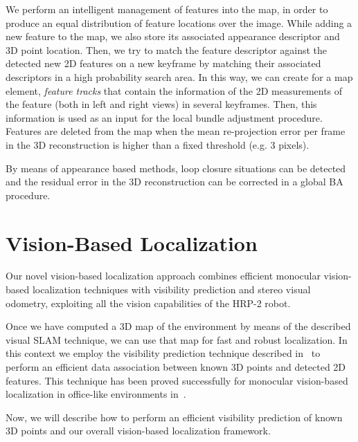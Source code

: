 \documentclass[conference]{IEEEtran}
\begin{document}
We perform an intelligent management of features into the map, in order to produce an equal distribution of feature locations over the image. While adding a new feature to the map, we also store its associated appearance descriptor and 3D point location. Then, we try to match the feature descriptor against the detected new 2D features on a new keyframe by matching their associated descriptors in a high probability search area. In this way, we can create for a map element, \textit{feature tracks} that contain the information of the 2D measurements of the feature (both in left and right views) in several keyframes. Then, this information is used as an input for the local bundle adjustment procedure. Features are deleted from the map when the mean re-projection error per frame in the 3D reconstruction is higher than a fixed threshold (e.g. 3 pixels). 

By means of appearance based methods, loop closure situations can be detected and the residual error in the 3D reconstruction can be corrected in a global BA procedure.

\section{Vision-Based Localization}\label{sec:localization}
Our novel vision-based localization approach combines efficient monocular vision-based localization techniques with visibility prediction and stereo visual odometry, exploiting all the vision capabilities of the HRP-2 robot. 

Once we have computed a 3D map of the environment by means of the described visual SLAM technique, we can use that map for fast and robust localization. In this context we employ the visibility prediction technique described in~\cite{Alcantarilla11icra} to perform an efficient data association between known 3D points and detected 2D features. This technique has been proved successfully for monocular vision-based localization in office-like environments in~\cite{Alcantarilla10icra}. 

Now, we will describe how to perform an efficient visibility prediction of known 3D points and our overall vision-based localization framework.

\end{document}
